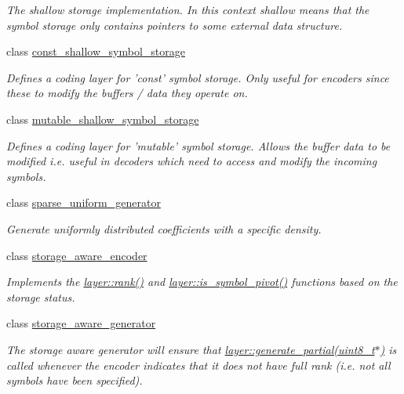 \begin{DoxyCompactItemize}
\begin{DoxyCompactList}\small\item\em The shallow storage implementation. In this context shallow means that the symbol storage only contains pointers to some external data structure. \end{DoxyCompactList}\item 
class \hyperlink{classkodo_1_1const__shallow__symbol__storage}{const\-\_\-shallow\-\_\-symbol\-\_\-storage}
\begin{DoxyCompactList}\small\item\em Defines a coding layer for 'const' symbol storage. Only useful for encoders since these to modify the buffers / data they operate on. \end{DoxyCompactList}\item 
class \hyperlink{classkodo_1_1mutable__shallow__symbol__storage}{mutable\-\_\-shallow\-\_\-symbol\-\_\-storage}
\begin{DoxyCompactList}\small\item\em Defines a coding layer for 'mutable' symbol storage. Allows the buffer data to be modified i.\-e. useful in decoders which need to access and modify the incoming symbols. \end{DoxyCompactList}\item 
class \hyperlink{classkodo_1_1sparse__uniform__generator}{sparse\-\_\-uniform\-\_\-generator}
\begin{DoxyCompactList}\small\item\em Generate uniformly distributed coefficients with a specific density. \end{DoxyCompactList}\item 
class \hyperlink{classkodo_1_1storage__aware__encoder}{storage\-\_\-aware\-\_\-encoder}
\begin{DoxyCompactList}\small\item\em Implements the \hyperlink{group__encoder__api_ga10c217148f82a6ed036563d3542cad72}{layer\-::rank()} and \hyperlink{group__encoder__api_ga72b86000f3b686b3d2791e71f4950dc6}{layer\-::is\-\_\-symbol\-\_\-pivot()} functions based on the storage status. \end{DoxyCompactList}\item 
class \hyperlink{classkodo_1_1storage__aware__generator}{storage\-\_\-aware\-\_\-generator}
\begin{DoxyCompactList}\small\item\em The storage aware generator will ensure that \hyperlink{group__coefficient__generator__api_ga295e2fc5a74a92ef2281549a31379ba5}{layer\-::generate\-\_\-partial(uint8\-\_\-t$\ast$)} is called whenever the encoder indicates that it does not have full rank (i.\-e. not all symbols have been specified). \end{DoxyCompactList}\item 

\end{DoxyCompactItemize}
